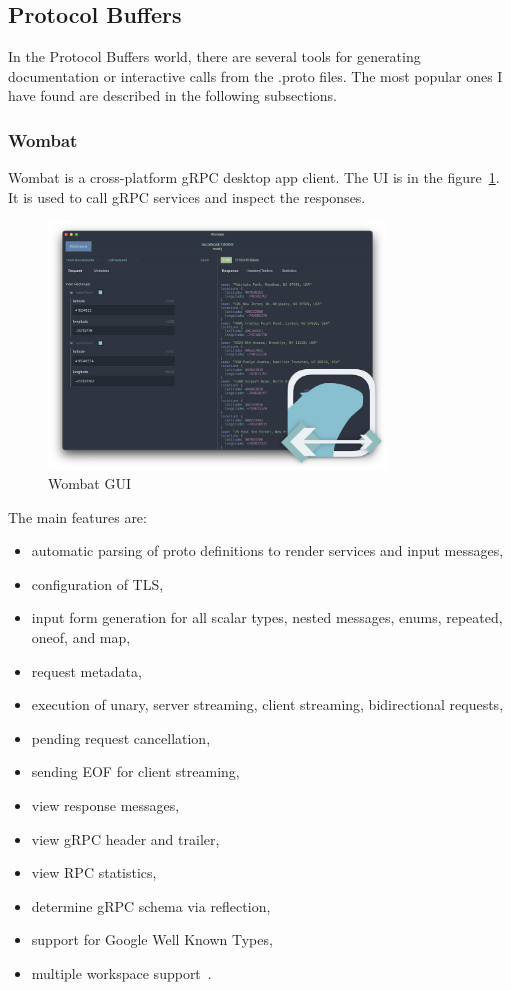 \subsection{Protocol Buffers}
In the Protocol Buffers world, there are several tools for generating documentation or interactive calls from the .proto files.
The most popular ones I have found are described in the following subsections.

\subsubsection{Wombat}
Wombat is a cross-platform gRPC desktop app client.
The UI is in the figure~\ref{fig:grpc-wombat}.
It is used to call gRPC services and inspect the responses.
\cite{grpc-wombat}

\begin{figure}[hbt!]
    \centering
    \captionsetup{justification=centering}
    \includegraphics[width=0.8\textwidth]{images/grpc/wombat}
    \caption{Wombat GUI~\cite{grpc-wombat}}
    \label{fig:grpc-wombat}
\end{figure}

The main features are:
\begin{itemize}
    \item automatic parsing of proto definitions to render services and input messages,
    \item configuration of TLS,
    \item input form generation for all scalar types, nested messages, enums, repeated, oneof, and map,
    \item request metadata,
    \item execution of unary, server streaming, client streaming, bidirectional requests,
    \item pending request cancellation,
    \item sending EOF for client streaming,
    \item view response messages,
    \item view gRPC header and trailer,
    \item view RPC statistics,
    \item determine gRPC schema via reflection,
    \item support for Google Well Known Types,
    \item multiple workspace support~\cite{grpc-wombat}.
\end{itemize}

